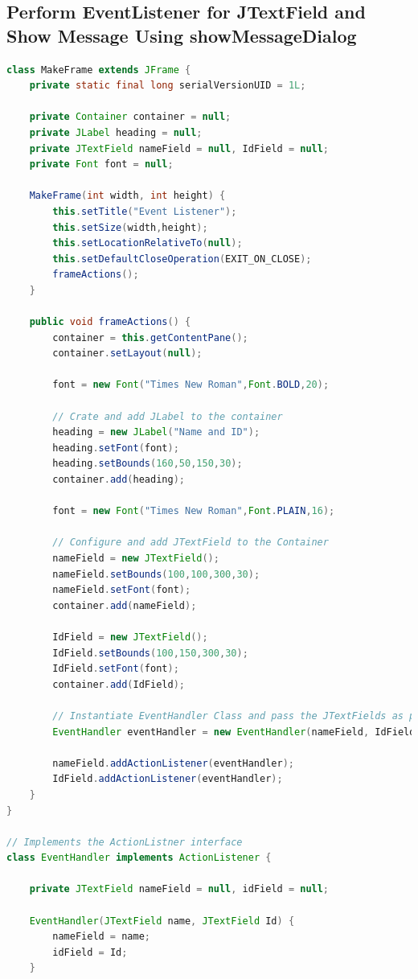 \subsection{Perform EventListener for JTextField and Show Message Using showMessageDialog}

\begin{frame}

\begin{lstlisting}[language=java]
class MakeFrame extends JFrame {
	private static final long serialVersionUID = 1L;
	
	private Container container = null;
	private JLabel heading = null;
	private JTextField nameField = null, IdField = null;
	private Font font = null;
	
	MakeFrame(int width, int height) {
		this.setTitle("Event Listener");
		this.setSize(width,height);
		this.setLocationRelativeTo(null);
		this.setDefaultCloseOperation(EXIT_ON_CLOSE);
		frameActions();
	}
	
	public void frameActions() {
		container = this.getContentPane();
		container.setLayout(null);
		
		font = new Font("Times New Roman",Font.BOLD,20);
		
		// Crate and add JLabel to the container
		heading = new JLabel("Name and ID");
		heading.setFont(font);
		heading.setBounds(160,50,150,30);
		container.add(heading);
		
		font = new Font("Times New Roman",Font.PLAIN,16);
		
		// Configure and add JTextField to the Container
		nameField = new JTextField();
		nameField.setBounds(100,100,300,30);
		nameField.setFont(font);
		container.add(nameField);
		
		IdField = new JTextField();
		IdField.setBounds(100,150,300,30);
		IdField.setFont(font);
		container.add(IdField);
		
		// Instantiate EventHandler Class and pass the JTextFields as parameter
		EventHandler eventHandler = new EventHandler(nameField, IdField);
		
		nameField.addActionListener(eventHandler);
		IdField.addActionListener(eventHandler);
	}
}

// Implements the ActionListner interface
class EventHandler implements ActionListener {
	
	private JTextField nameField = null, idField = null;
	
	EventHandler(JTextField name, JTextField Id) {
		nameField = name;
		idField = Id;
	}
	

\end{lstlisting}
\end{frame}
